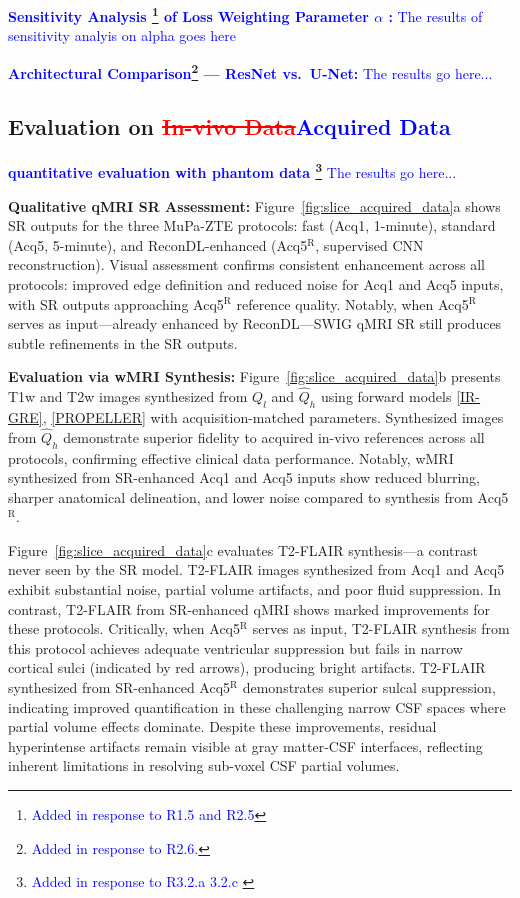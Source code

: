 \documentclass[journal,twoside,web]{ieeecolor}
\newcommand{\added}[1]{\textcolor{blue}{#1}}      %
\newcommand{\deleted}[1]{\textcolor{red}{\st{#1}}} %
\begin{document}
\added{\textbf{Sensitivity Analysis \footnote{\textcolor{blue}{Added in response to R1.5 and R2.5}} of Loss Weighting Parameter $\alpha$ :} The results of sensitivity analyis on alpha goes here}



\added{\textbf{Architectural Comparison\footnote{\textcolor{blue}{Added in response to R2.6.}} --- ResNet vs.\ U-Net:} The results go here... }

\subsection{Evaluation on \deleted{In-vivo Data}\added{Acquired Data}}


\added{\textbf{quantitative evaluation with phantom data \footnote{\textcolor{blue}{Added in response to R3.2.a 3.2.c }}} The results go here... }



\textbf{Qualitative qMRI SR Assessment:}
Figure~\ref{fig:slice_acquired_data}a shows SR outputs for the three MuPa-ZTE protocols: fast (Acq1, 1-minute), standard (Acq5, 5-minute), and ReconDL-enhanced (Acq5$^{\text{R}}$, supervised CNN reconstruction). Visual assessment confirms consistent enhancement across all protocols: improved edge definition and reduced noise for Acq1 and Acq5 inputs, with SR outputs approaching Acq5$^{\text{R}}$ reference quality. Notably, when Acq5$^{\text{R}}$ serves as input—already enhanced by ReconDL—SWIG qMRI SR still produces subtle refinements in the SR outputs.






\textbf{Evaluation via wMRI Synthesis:}
Figure~\ref{fig:slice_acquired_data}b presents T1w and T2w images synthesized from $Q_l$ and $\hat{Q}_h$ using forward models \ref{IR-GRE}, \ref{PROPELLER} with acquisition-matched parameters. Synthesized images from $\hat{Q}_h$ demonstrate superior fidelity to acquired in-vivo references across all protocols, confirming effective clinical data performance. Notably, wMRI synthesized from SR-enhanced Acq1 and Acq5 inputs show reduced blurring, sharper anatomical delineation, and lower noise compared to synthesis from Acq5$^{\text{R}}$.

Figure~\ref{fig:slice_acquired_data}c evaluates T2-FLAIR synthesis—a contrast never seen by the SR model. T2-FLAIR images synthesized from Acq1 and Acq5 exhibit substantial noise, partial volume artifacts, and poor fluid suppression. In contrast, T2-FLAIR from SR-enhanced qMRI shows marked improvements for these protocols. Critically, when Acq5$^{\text{R}}$ serves as input, T2-FLAIR synthesis from this protocol achieves adequate ventricular suppression but fails in narrow cortical sulci (indicated by red arrows), producing bright artifacts. T2-FLAIR synthesized from SR-enhanced Acq5$^{\text{R}}$ demonstrates superior sulcal suppression, indicating improved quantification in these challenging narrow CSF spaces where partial volume effects dominate. Despite these improvements, residual hyperintense artifacts remain visible at gray matter-CSF interfaces, reflecting inherent limitations in resolving sub-voxel CSF partial volumes.
\end{document}
